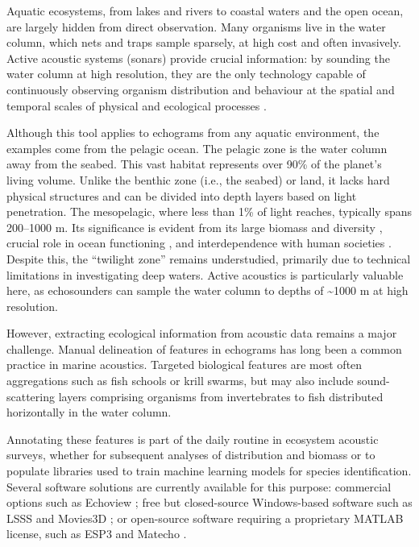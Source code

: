 \documentclass[
  number,
  preprint,
  3p]{elsarticle}
\begin{document}
Aquatic ecosystems, from lakes and rivers to coastal waters and the open
ocean, are largely hidden from direct observation. Many organisms live
in the water column, which nets and traps sample sparsely, at high cost
and often invasively. Active acoustic systems (sonars) provide crucial
information: by sounding the water column at high resolution, they are
the only technology capable of continuously observing organism
distribution and behaviour at the spatial and temporal scales of
physical and ecological processes \citep{benoit-bird2016}.

Although this tool applies to echograms from any aquatic environment,
the examples come from the pelagic ocean. The pelagic zone is the water
column away from the seabed. This vast habitat represents over 90\% of
the planet's living volume. Unlike the benthic zone (i.e., the seabed)
or land, it lacks hard physical structures and can be divided into depth
layers based on light penetration. The mesopelagic, where less than 1\%
of light reaches, typically spans 200--1000 m. Its significance is
evident from its large biomass and diversity
\citep{irigoien2014, eduardo2024, haddock2024}, crucial role in ocean
functioning \citep{robinson2010, passow2012}, and interdependence with
human societies \citep{martin2020, eduardo2025}. Despite this, the
``twilight zone'' remains understudied, primarily due to technical
limitations in investigating deep waters. Active acoustics is
particularly valuable here, as echosounders can sample the water column
to depths of \textasciitilde1000 m at high resolution.

However, extracting ecological information from acoustic data remains a
major challenge. Manual delineation of features in echograms has long
been a common practice in marine acoustics. Targeted biological features
are most often aggregations such as fish schools or krill swarms, but
may also include sound-scattering layers comprising organisms from
invertebrates to fish distributed horizontally in the water column.

Annotating these features is part of the daily routine in ecosystem
acoustic surveys, whether for subsequent analyses of distribution and
biomass or to populate libraries used to train machine learning models
for species identification. Several software solutions are currently
available for this purpose: commercial options such as Echoview
\citep{echoview}; free but closed-source Windows-based software such as
LSSS \citep{korneliussen2006} and Movies3D \citep{trenkel2009}; or
open-source software requiring a proprietary MATLAB license, such as
ESP3 and Matecho \citep{ladroit2020, perrot2018}.
\end{document}
